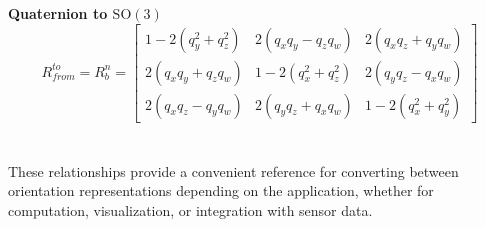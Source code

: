 \textbf{Quaternion to $\mathrm{SO}(3)$}
\begin{equation}
    R_{from}^{to} = R_{b}^{n} =
    \begin{bmatrix}
        1 - 2(q_y^2 + q_z^2) & 2(q_x q_y - q_z q_w) & 2(q_x q_z + q_y q_w) \\
        2(q_x q_y + q_z q_w) & 1 - 2(q_x^2 + q_z^2) & 2(q_y q_z - q_x q_w) \\
        2(q_x q_z - q_y q_w) & 2(q_y q_z + q_x q_w) & 1 - 2(q_x^2 + q_y^2)
    \end{bmatrix}
    \label{eq:system-modeling-quaternion-to-so3}
\end{equation}
\\ \\
\noindent
These relationships provide a convenient reference for converting between orientation representations depending on the application, whether for computation, visualization, or integration with sensor data.
